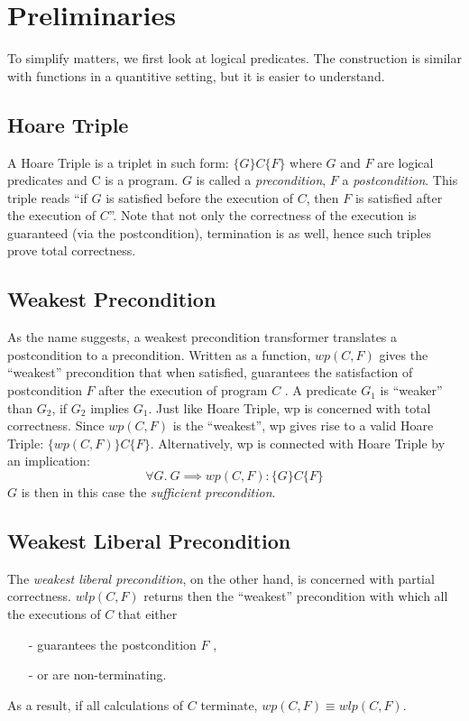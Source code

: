 \documentclass[adraft,hidelinks]{eptcs}
\begin{document}
\section{Preliminaries}
To simplify matters, we first look at logical predicates. 
The construction is similar with functions in a quantitive setting, but it is easier to understand.

\subsection{Hoare Triple}
A Hoare Triple is a triplet in such form: $ \{G\} C \{F\}$ where $G$ and $F$ are logical predicates and C is a program. 
$G$ is called a \textit{precondition}, $F$ a \textit{postcondition}. 
This triple reads ``if $G$ is satisfied before the execution of $C$, then $F$ is satisfied after the execution of $C$''. 
Note that not only the correctness of the execution is guaranteed (via the postcondition), termination is as well, hence such triples prove total correctness. 

\subsection{Weakest Precondition}
As the name suggests, a weakest precondition transformer translates a postcondition to a precondition. 
Written as a function, $wp(C,F)$ gives the ``weakest'' precondition that when satisfied, guarantees the satisfaction of postcondition $F$ after the execution of program $C$ . 
A predicate $G_1$ is ``weaker'' than $G_2$, if $G_2$ implies $G_1$. 
Just like Hoare Triple, wp is concerned with total correctness. 
Since $wp(C,F)$ is the ``weakest'', wp gives rise to a valid Hoare Triple: $\{wp(C,F)\} C \{F\}$. 
Alternatively, wp is connected with Hoare Triple by an implication: 
\[\forall G.\ G\implies wp(C,F): \{G\} C \{F\}\]
$G$ is then in this case the \textit{sufficient precondition}. 

\subsection{Weakest Liberal Precondition}
The \textit{weakest liberal precondition}, on the other hand, is concerned with partial correctness. 
$wlp(C,F)$ returns then the ``weakest'' precondition with which all the executions of $C$ that either
\begin{itemize}
    \item[-] guarantees the postcondition $F$ , 
    \item[-] or are non-terminating. 
\end{itemize}
As a result, if all calculations of $C$ terminate, $wp(C,F)\equiv wlp(C,F)$. 
\end{document}

